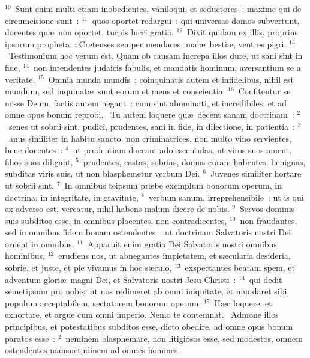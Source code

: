 ${}^{10}$~Sunt enim multi etiam inobedientes, vaniloqui, et seductores~: maxime qui de circumcisione sunt~:
${}^{11}$~quos oportet redargui~: qui universas domos subvertunt, docentes qu\ae\ non oportet, turpis lucri gratia.
${}^{12}$~Dixit quidam ex illis, proprius ipsorum propheta~: Cretenses semper mendaces, mal\ae\ besti\ae , ventres pigri.
${}^{13}$~Testimonium hoc verum est. Quam ob causam increpa illos dure, ut sani sint in fide,
${}^{14}$~non intendentes judaicis fabulis, et mandatis hominum, aversantium se a veritate.
${}^{15}$~Omnia munda mundis~: coinquinatis autem et infidelibus, nihil est mundum, sed inquinat\ae\ sunt eorum et mens et conscientia.
${}^{16}$~Confitentur se nosse Deum, factis autem negant~: cum sint abominati, et incredibiles, et ad omne opus bonum reprobi.
~\lettrine[lines=10,image=true,loversize=0.05,lraise=-0.03]{T}{}u autem loquere qu\ae\ decent sanam doctrinam~:
${}^{2}$~senes ut sobrii sint, pudici, prudentes, sani in fide, in dilectione, in patientia~:
${}^{3}$~anus similiter in habitu sancto, non criminatrices, non multo vino servientes, bene docentes~:
${}^{4}$~ut prudentiam doceant adolescentulas, ut viros suos ament, filios suos diligant,
${}^{5}$~prudentes, castas, sobrias, domus curam habentes, benignas, subditas viris suis, ut non blasphemetur verbum Dei.
${}^{6}$~Juvenes similiter hortare ut sobrii sint.
${}^{7}$~In omnibus teipsum pr\ae be exemplum bonorum operum, in doctrina, in integritate, in gravitate,
${}^{8}$~verbum sanum, irreprehensibile~: ut is qui ex adverso est, vereatur, nihil habens malum dicere de nobis.
${}^{9}$~Servos dominis suis subditos esse, in omnibus placentes, non contradicentes,
${}^{10}$~non fraudantes, sed in omnibus fidem bonam ostendentes~: ut doctrinam Salvatoris nostri Dei ornent in omnibus.
${}^{11}$~Apparuit enim gratia Dei Salvatoris nostri omnibus hominibus,
${}^{12}$~erudiens nos, ut abnegantes impietatem, et s\ae cularia desideria, sobrie, et juste, et pie vivamus in hoc s\ae culo,
${}^{13}$~exspectantes beatam spem, et adventum glori\ae\ magni Dei, et Salvatoris nostri Jesu Christi~:
${}^{14}$~qui dedit semetipsum pro nobis, ut nos redimeret ab omni iniquitate, et mundaret sibi populum acceptabilem, sectatorem bonorum operum.
${}^{15}$~H\ae c loquere, et exhortare, et argue cum omni imperio. Nemo te contemnat.
~\lettrine[lines=10,image=true,loversize=0.05,lraise=-0.03]{A}{}dmone illos principibus, et potestatibus subditos esse, dicto obedire, ad omne opus bonum paratos esse~:
${}^{2}$~neminem blasphemare, non litigiosos esse, sed modestos, omnem ostendentes mansuetudinem ad omnes homines.

